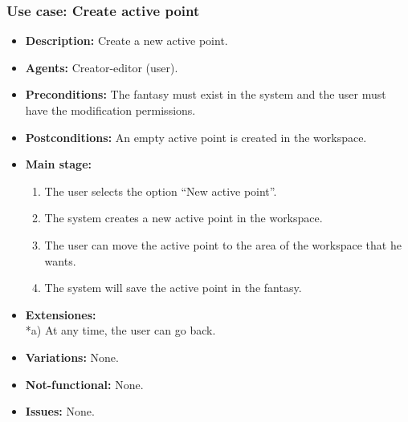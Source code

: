 \subsubsection{Use case: Create active point}
\begin{itemize}
	\item \textbf{Description:} Create a new active point.
	\item \textbf{Agents:} Creator-editor (user).
	\item \textbf{Preconditions:} The fantasy must exist in the system and the user must have the modification permissions.
	\item \textbf{Postconditions:} An empty active point is created in the workspace.
	\item \textbf{Main stage:}
	\begin{enumerate}
		\item The user selects the option ``New active point''.
		\item The system creates a new active point in the workspace.
		\item The user can move the active point to the area of the workspace that he wants.
		\item The system will save the active point in the fantasy.
	\end{enumerate}
	\item \textbf{Extensiones:} \\ *a) At any time, the user can go back.
	\item \textbf{Variations:} None.
	\item \textbf{Not-functional:} None.
	\item \textbf{Issues:} None.
\end{itemize}

